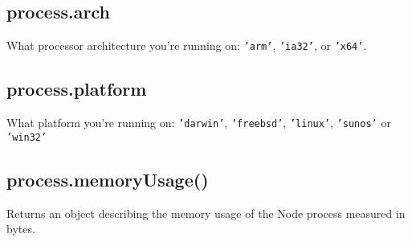\subsection{process.arch}

What processor architecture you're running on: \texttt{'arm'},
\texttt{'ia32'}, or \texttt{'x64'}.

\begin{Shaded}
\begin{Highlighting}[]
\NormalTok{(} \NormalTok{+ }\NormalTok{);}
\end{Highlighting}
\end{Shaded}

\subsection{process.platform}

What platform you're running on: \texttt{'darwin'}, \texttt{'freebsd'},
\texttt{'linux'}, \texttt{'sunos'} or \texttt{'win32'}

\begin{Shaded}
\begin{Highlighting}[]
\NormalTok{(} \NormalTok{+ }\NormalTok{);}
\end{Highlighting}
\end{Shaded}

\subsection{process.memoryUsage()}

Returns an object describing the memory usage of the Node process
measured in bytes.

\begin{Shaded}
\begin{Highlighting}[]
 \NormalTok{);}

\NormalTok{(}\NormalTok{(}\NormalTok{()));}
\end{Highlighting}
\end{Shaded}


